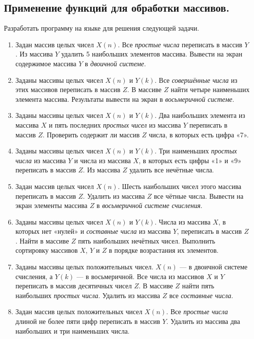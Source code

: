 \subsection[Применение функций для обработки массивов.]{Применение функций для обработки массивов.}
Разработать программу на языке  для решения следующей задачи.

\begin{enumerate}
\item Задан массив целых чисел $X(n)$. Все \emph{простые числа} переписать в массив
$Y$. Из массива $Y$ удалить 5 наибольших элементов массива. Вывести на экран содержимое массива
$Y$ в \emph{двоичной системе}.
\item Заданы массивы целых чисел $X(n)$ и $Y(k)$. Все
\emph{совершённые числа} из этих массивов переписать в массив $Z$. В массиве
$Z$ найти четыре наименьших элемента массива. 
Результаты вывести на экран в \emph{восьмеричной системе}. 
\item Заданы массивы целых чисел $X(n)$ и $Y(k)$. Два наибольших
элемента из массива $X$ и пять последних \emph{простых чисел} из массива
$Y$ переписать в массив $Z$. Проверить содержит ли массив $Z$ числа, в
которых есть цифра «7».
\item Заданы массивы целых чисел $X(n)$ и $Y(k)$. Три наименьших
\emph{простых числа} из массива $Y$ и числа из массива $X$, в которых есть цифры «1»
и «9» переписать в массив $Z$. Из  массива $Z$ удалить все нечётные числа.
\item Задан массив целых чисел $X(n)$. Шесть наибольших чисел этого массива переписать в массив
$Z$. Удалить из массива $Z$ все чётные числа. Вывести на экран элементы массива
$Z$ в \emph{восьмеричной системе счисления}.
\item Заданы массивы целых чисел $X(n)$ и $Y(k)$. Числа из массива
$X$, в которых нет «нулей» и \emph{составные числа} из массива $Y$, переписать в массив
$Z$. Найти в массиве $Z$ пять наибольших нечётных чисел. Выполнить сортировку массивов $X$,
$Y$ и $Z$ в порядке возрастания их элементов.
\item Заданы массивы целых положительных чисел. $X(n)$ --- в двоичной системе счисления, а 
$Y(k)$ --- в восьмеричной. Все числа из массивов $X$ и $Y$
переписать в массив десятичных чисел $Z$. В массиве $Z$ найти пять наибольших
\emph{простых числа}. Удалить из массива $Z$ все \emph{составные числа}.
\item Задан массив целых положительных чисел $X(n)$. Все \emph{простые числа} длиной не более
пяти цифр переписать в массив $Y$. Удалить из массива два наибольших и три наименьших числа.

\end{enumerate}
